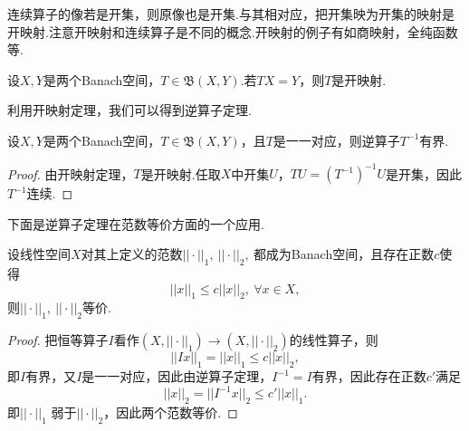 \documentclass[lang=cn,10pt]{elegantbook}
\begin{document}
	连续算子的像若是开集，则原像也是开集.与其相对应，把开集映为开集的映射是开映射.注意开映射和连续算子是不同的概念.开映射的例子有如商映射，全纯函数等.
	\begin{theorem}[开映射定理(3.2.1)]
		设\(X,Y\)是两个Banach空间，\(T\in \mathfrak{B}(X,Y)\).若\(TX=Y\)，则\(T\)是开映射.
	\end{theorem}
	利用开映射定理，我们可以得到逆算子定理.
	\begin{theorem}[逆算子定理(3.2.2)]
		设\(X,Y\)是两个Banach空间，\(T\in \mathfrak{B}(X,Y)\)，且\(T\)是一一对应，则逆算子\(T^{-1}\)有界.
	\end{theorem}
	\begin{proof}
		由开映射定理，\(T\)是开映射.任取\(X\)中开集\(U\)，\(TU=(T^{-1})^{-1}U\)是开集，因此\(T^{-1}\)连续.
	\end{proof}
	下面是逆算子定理在范数等价方面的一个应用.
	\begin{theorem}[范数等价定理]
		设线性空间\(X\)对其上定义的范数\(||\cdot ||_1,\ ||\cdot||_2,\ \)都成为Banach空间，且存在正数\(c\)使得
		\[||x||_1\le c||x||_2,\ \forall x \in X,\]
		则\(||\cdot ||_1,\ ||\cdot||_2\)等价.
	\end{theorem}
	\begin{proof}
		把恒等算子\(I\)看作\((X,||\cdot||_1)\to (X,||\cdot||_2)\)的线性算子，则
		\[||Ix||_1=||x||_1\le c||x||_2,\]
		即\(I\)有界，又\(I\)是一一对应，因此由逆算子定理，\(I^{-1}=I\)有界，因此存在正数\(c'\)满足
		\[||x||_2=||I^{-1}x||_2\le c'||x||_1.\]
		即\(||\cdot ||_1\) 弱于\(||\cdot||_2\)，因此两个范数等价.
	\end{proof}
	
\end{document}
